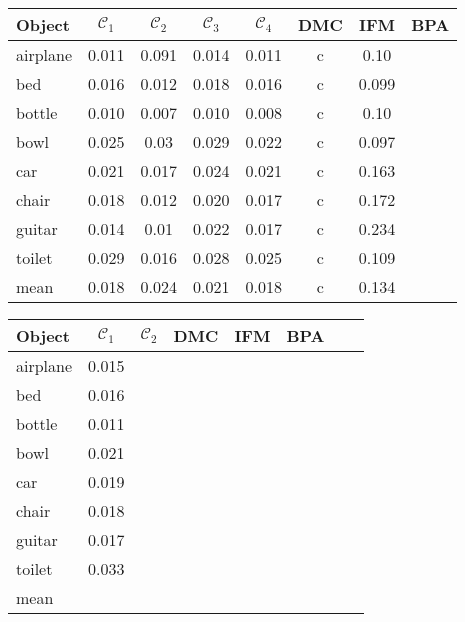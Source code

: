 \begin{center}
     \label{tab:distance1024} 
    \begin{tabular}{| l  | c | c | c | c | c | c | c |}
        \hline
        Object& $\mathcal{C}_1$ & $\mathcal{C}_2$ & $\mathcal{C}_3$ & $\mathcal{C}_4$ & DMC & IFM & BPA \\ \hline
        \multirow{1}{*}{airplane}&0.011&0.091&0.014&0.011&c&0.10&\\\hline
        \multirow{1}{*}{bed}&0.016&0.012&0.018&0.016&c&0.099&\\        \hline
        \multirow{1}{*}{bottle}&0.010&0.007&0.010&0.008&c&0.10&\\        \hline
        \multirow{1}{*}{bowl}&0.025&0.03&0.029&0.022&c&0.097&\\        \hline
        \multirow{1}{*}{car}&0.021&0.017&0.024&0.021&c&0.163&\\        \hline
        \multirow{1}{*}{chair}&0.018&0.012&0.020&0.017&c&0.172&\\        \hline
        \multirow{1}{*}{guitar}&0.014&0.01&0.022&0.017&c&0.234&\\        \hline
        \multirow{1}{*}{toilet}&0.029&0.016&0.028&0.025&c&0.109&\\        \hline\hline
        \multirow{1}{*}{mean}&0.018&0.024&0.021&0.018&c&0.134&\\        \hline
    \end{tabular}
\end{center}
\begin{center}
     \label{tab:distance1024} 
    \begin{tabular}{| l  | c | c | c | c | c | c | c |}
        \hline
        Object& $\mathcal{C}_1$ & $\mathcal{C}_2$ & DMC & IFM & BPA \\ \hline
        \multirow{1}{*}{airplane}&0.015&&&&\\\hline
        \multirow{1}{*}{bed}&0.016&&&&\\\hline
        \multirow{1}{*}{bottle}&0.011&&&&\\\hline
        \multirow{1}{*}{bowl}&0.021&&&&\\\hline
        \multirow{1}{*}{car}&0.019&&&&\\\hline
        \multirow{1}{*}{chair}&0.018&&&&\\\hline
        \multirow{1}{*}{guitar}&0.017&&&&\\\hline
        \multirow{1}{*}{toilet}&0.033&&&&\\\hline
        \multirow{1}{*}{mean}&&&&&\\\hline
    \end{tabular}
\end{center}
